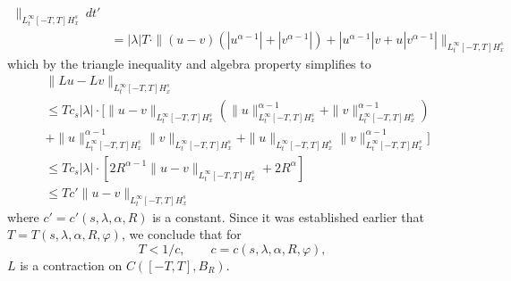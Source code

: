 \documentclass[12pt,reqno]{amsart}
\newcommand{\vp}{\varphi}
\theoremstyle{plain}  %
\begin{document}
\begin{appendices}
\begin{equation*}
\begin{split}
		\|_{L^\infty_t[-T, T] H^s_x} \ dt'
		\\
		& = |\lambda| T \cdot \|(u-v)(|u^{\alpha -1}| + |v^{\alpha -1}|) 
		+ |u^{\alpha -1}|v 
		+ u |v^{\alpha -1}| \|_{L^\infty_t[-T, T] H^s_x}
	\end{split}
\end{equation*}
%
%
which by the triangle inequality and algebra property simplifies to
%
%
\begin{equation}
	\label{L-contract}
	\begin{split}
		& \|Lu-Lv\|_{L^\infty_t[-T, T] H^s_x}
		\\
		& \le  T c_s |\lambda| \cdot \big [ \|u-v\|_{L^\infty_t[-T, T]
		H^s_x}(\|u\|^{\alpha -1}_{L^\infty_t[-T, T] H^s_x} +
		\|v\|^{\alpha -1}_{L^\infty_t[-T, T] H^s_x})
		\\
		& + \|u\|^{\alpha-1}_
		{L^\infty_t[-T, T] H^s_x} \|v\|_{L^\infty_t[-T, T] H^s_x}
		+ \|u\|_
		{L^\infty_t[-T, T] H^s_x} \|v\|^{\alpha -1}_
		{L^\infty_t[-T, T] H^s_x} \big ]
		\\
		& \le T c_s |\lambda| \cdot \left[  2R^{\alpha -1} 
		\|u -v\|_{L^\infty_t[-T, T] H^s_x} + 2R^{\alpha} \right]
		\\
		& \le T c' \|u -v \|_{L^\infty_t[-T, T] 
		H^s_x}
	\end{split}
\end{equation}
%
%
where $c' = c'(s, \lambda, \alpha, R)$ is a constant.
Since it was established earlier that $T = T(s, \lambda, \alpha, R, \vp)$,  
we conclude that for $$T < 1/c,  \qquad c = c(s, \lambda, \alpha, R, 
\vp),$$ $L$ is a 
contraction on $C([-T, T], B_R)$. \qquad \qedsymbol

\end{appendices}
\end{document}
